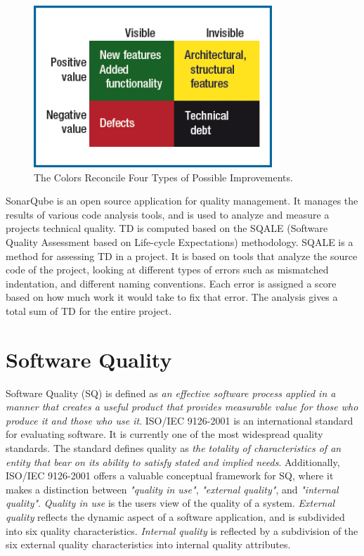 \begin{figure}[ht!]
	\centering
	\includegraphics[width=0.8\textwidth]{images/fourColorBacklog.png}
	\caption{The Colors Reconcile Four Types of Possible Improvements.}
	\label{fig:fourColorBacklog}
\end{figure}

SonarQube is an open source application for quality management\cite{sonarsource2013sonarqube}. It manages the results of various code analysis tools, and is used to analyze and measure a projects technical quality. TD is computed based on the SQALE (Software Quality Assessment based on Life-cycle Expectations) methodology\cite{letouzey2012sqale}. SQALE is a method for assessing TD in a project. It is based on tools that analyze the source code of the project, looking at different types of errors such as mismatched indentation, and different naming conventions. Each error is assigned a score based on how much work it would take to fix that error. The analysis gives a total sum of TD for the entire project.






\section{Software Quality}
\label{sec:2-SQ}
Software Quality (SQ) is defined as \textit{an effective software process applied in a manner that creates a useful product that provides measurable value for those who produce it and those who use it}\cite{Pressman:2009:SEP:1593949}. ISO/IEC 9126-2001 is an international standard for evaluating software\cite{ISOIEC9126}. It is currently one of the most widespread quality standards\cite{trienekens2010quality}. The standard defines quality as \textit{the totality of characteristics of an entity that bear on its ability to satisfy stated and implied needs}. Additionally, ISO/IEC 9126-2001 offers a valuable conceptual framework for SQ, where it makes a distinction between \textit{"quality in use"}, \textit{"external quality"}, and \textit{"internal quality"}\cite{ISOIEC9126,trienekens2010quality}. \textit{Quality in use} is the users view of the quality of a system. \textit{External quality} reflects the dynamic aspect of a software application, and is subdivided into six quality characteristics. \textit{Internal quality} is reflected by a subdivision of the six external quality characteristics into internal quality attributes.

